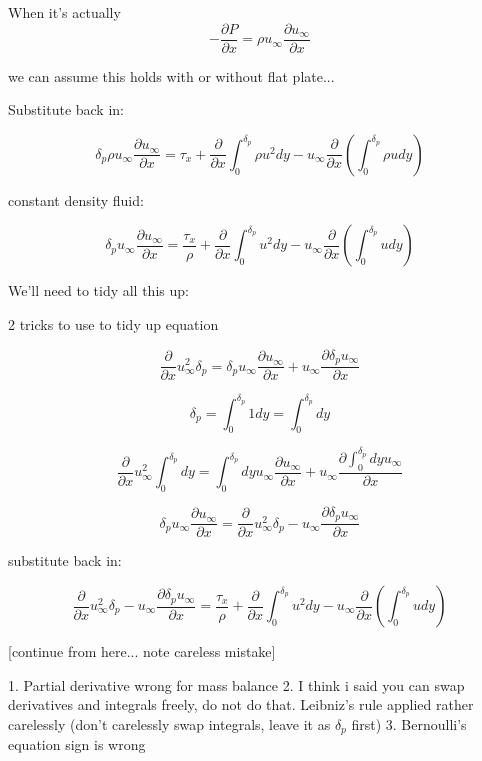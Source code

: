 \documentclass[11pt]{article}
\begin{document}
When it's actually
$$-\frac{\partial P}{\partial x} = \rho u_\infty \frac{\partial u_\infty}{\partial x}$$

we can assume this holds with or without flat plate...

Substitute back in:

$$ \delta_p \rho u_\infty \frac{\partial u_\infty}{\partial x} = \tau_x + \frac{\partial }{\partial x} \int_0^{\delta_p} \rho u^2 dy    -u_\infty \frac{\partial }{\partial x} ( \int_0^{\delta_p } \rho u dy )   $$

constant density fluid:

$$ \delta_p  u_\infty \frac{\partial u_\infty}{\partial x} =  \frac{\tau_x}{\rho} + \frac{\partial }{\partial x} \int_0^{\delta_p}  u^2 dy    -u_\infty \frac{\partial }{\partial x} ( \int_0^{\delta_p } u dy )   $$

We'll need to tidy all this up:

2 tricks to use to tidy up equation

$$\frac{\partial}{\partial x} u_\infty^2 \delta_p =  \delta_p  u_\infty \frac{\partial u_\infty}{\partial x} + u_\infty \frac{\partial \delta_p u_\infty}{\partial x} $$

$$\delta_p = \int_0^{\delta_p} 1 dy  = \int_0^{\delta_p} dy$$

$$\frac{\partial}{\partial x} u_\infty^2  \int_0^{\delta_p} dy =  \int_0^{\delta_p} dy  u_\infty \frac{\partial u_\infty}{\partial x} + u_\infty \frac{\partial \int_0^{\delta_p} dy u_\infty}{\partial x} $$

$$ \delta_p  u_\infty \frac{\partial u_\infty}{\partial x}  = \frac{\partial}{\partial x} u_\infty^2  \delta_p -u_\infty \frac{\partial \delta_p u_\infty}{\partial x} $$

substitute back in:

$$  \frac{\partial}{\partial x} u_\infty^2  \delta_p  -u_\infty \frac{\partial \delta_p  u_\infty}{\partial x}= \frac{\tau_x}{\rho} + \frac{\partial }{\partial x} \int_0^{\delta_p}  u^2 dy    - u_\infty\frac{\partial }{\partial x} ( \int_0^{\delta_p } u dy )   $$




[continue from here... note careless mistake]

1. Partial derivative wrong for mass balance 
2. I think i said you can swap derivatives and integrals freely, do not do that. Leibniz's rule applied rather carelessly (don't carelessly swap integrals, leave it as $\delta_p$ first)
3. Bernoulli's equation sign is wrong
\end{document}
